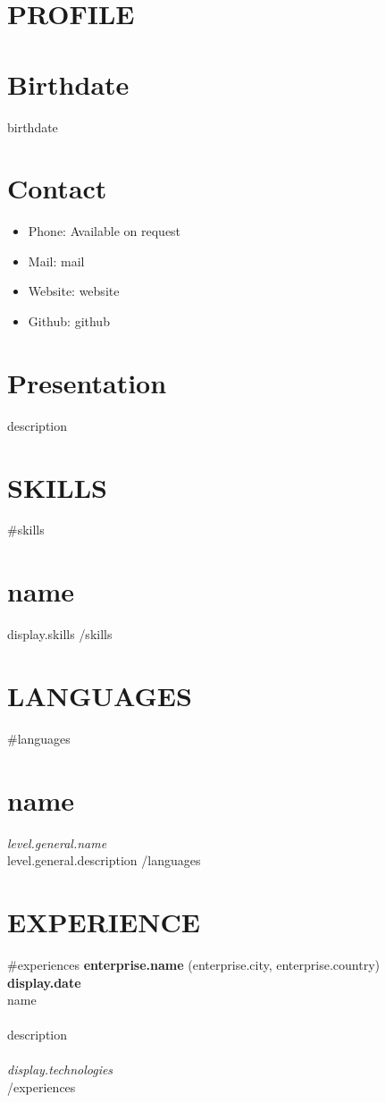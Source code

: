 \documentclass[margin]{res}
\begin{document}

\address{ {{address.city}}, {{address.country}}}

\begin{resume}

\section{PROFILE}
\normalsize{\section{Birthdate}} {{{birthdate}}}

\normalsize{\section{Contact}}
  \begin{itemize}
    \item Phone: Available on request
    \item Mail: {{{mail}}}
    \item Website: {{{website}}}
    \item Github: {{{github}}}
  \end{itemize}

\normalsize{\section{Presentation}} {{{description}}}

\section{SKILLS}
{{#skills}}\normalsize{\section{ {{{name}}} }}
  {{{display.skills}}}
{{/skills}}

\section{LANGUAGES}
{{#languages}}\normalsize{\section{ {{{name}}} }}
  \textit{ {{{level.general.name}}} } \\
  {{{level.general.description}}}
{{/languages}}

\section{EXPERIENCE}
{{#experiences}}
  \textbf{ {{enterprise.name}} } ({{enterprise.city}}, {{enterprise.country}}) \hfill \textbf{ {{{display.date}}} } \\
  {{name}}\\ \\
  {{description}} \\ \\
  \textit{ {{{display.technologies}}} } \\
{{/experiences}}


\end{resume}
\end{document}
